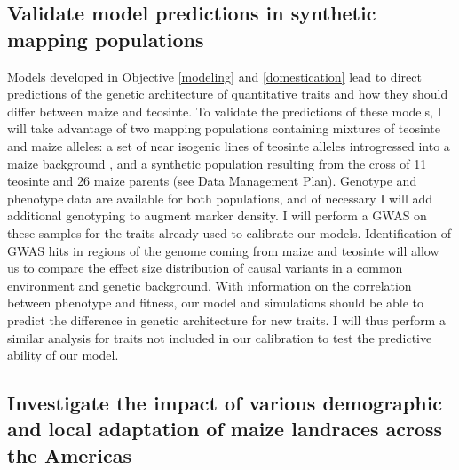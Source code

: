 
\subsection{Validate model predictions in synthetic mapping populations}
\label{validation}

Models developed in Objective \ref{modeling} and \ref{domestication} lead to direct predictions of the genetic architecture of quantitative traits and how they should differ between maize and teosinte. To validate the predictions of these models, I will take advantage of two mapping populations containing mixtures of teosinte and maize alleles: a set of near isogenic lines of teosinte alleles introgressed into a maize background \citep{Liu:InPress}, and a synthetic population resulting from the cross of 11 teosinte and 26 maize parents (see Data Management Plan). Genotype and phenotype data are available for both populations, and of necessary I will add additional genotyping to augment marker density.
I will perform a GWAS on these samples for the traits already used to calibrate our models. Identification of GWAS hits in regions of the genome coming from maize and teosinte will allow us to compare the effect size distribution of causal variants in a common environment and genetic background. With information on the correlation between phenotype and fitness, our model and simulations should be able to predict the difference in genetic architecture for new traits. I will thus perform a similar analysis for traits not included in our calibration to test the predictive ability of our model. 

\subsection{Investigate the impact of various demographic and local adaptation of maize landraces across the Americas} 
\label{surfing}

